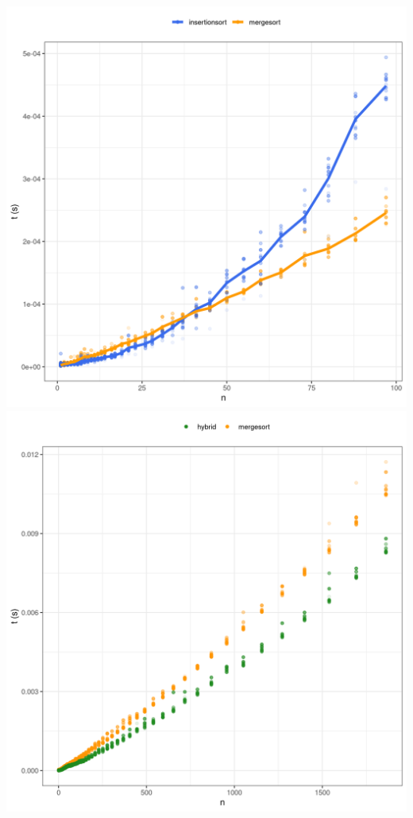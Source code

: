 \newpage
\centering
\includegraphics[scale=1]{../img/toAlgoritmerZoomedGns(BIG).png}
\newpage
\centering
\includegraphics[scale=1]{../img/toMergesort(BIG).png}
\newpage

